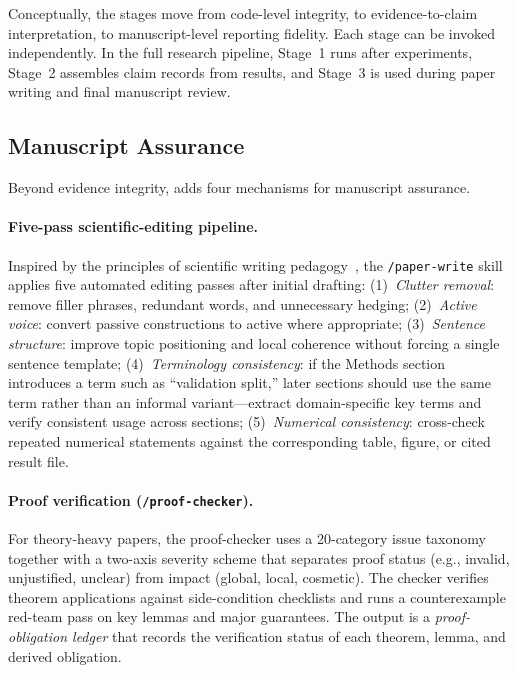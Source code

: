 Conceptually, the stages move from code-level integrity, to evidence-to-claim interpretation, to manuscript-level reporting fidelity.
Each stage can be invoked independently.
In the full research pipeline, Stage~1 runs after experiments, Stage~2 assembles claim records from results, and Stage~3 is used during paper writing and final manuscript review.

\subsection{Manuscript Assurance}
\label{sec:manuscript}

Beyond evidence integrity, \aris{} adds four mechanisms for manuscript assurance.

\paragraph{Five-pass scientific-editing pipeline.}
Inspired by the principles of scientific writing pedagogy~\citep{sainani2019writing}, the \texttt{/paper-write} skill applies five automated editing passes after initial drafting:
(1)~\emph{Clutter removal}: remove filler phrases, redundant words, and unnecessary hedging;
(2)~\emph{Active voice}: convert passive constructions to active where appropriate;
(3)~\emph{Sentence structure}: improve topic positioning and local coherence without forcing a single sentence template;
(4)~\emph{Terminology consistency}: if the Methods section introduces a term such as ``validation split,'' later sections should use the same term rather than an informal variant---extract domain-specific key terms and verify consistent usage across sections;
(5)~\emph{Numerical consistency}: cross-check repeated numerical statements against the corresponding table, figure, or cited result file.

\paragraph{Proof verification (\texttt{/proof-checker}).}
For theory-heavy papers, the proof-checker uses a 20-category issue taxonomy together with a two-axis severity scheme that separates proof status (e.g., invalid, unjustified, unclear) from impact (global, local, cosmetic).
The checker verifies theorem applications against side-condition checklists and runs a counterexample red-team pass on key lemmas and major guarantees.
The output is a \emph{proof-obligation ledger} that records the verification status of each theorem, lemma, and derived obligation.

